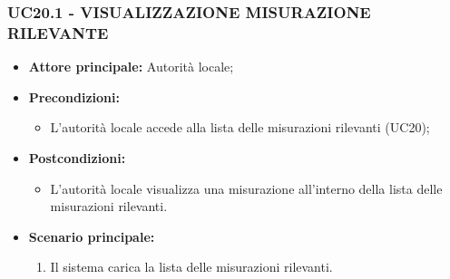 \subsubsection{UC20.1 - VISUALIZZAZIONE MISURAZIONE RILEVANTE}
\begin{itemize}
        \item \textbf{Attore principale:} Autorità locale;
        \item \textbf{Precondizioni:}
                \begin{itemize}
                        \item L'autorità locale accede alla lista delle misurazioni rilevanti (UC20);
                \end{itemize}
        \item \textbf{Postcondizioni:}
                \begin{itemize}
                        \item L'autorità locale visualizza una misurazione all'interno della lista delle misurazioni rilevanti.
                \end{itemize}
        \item \textbf{Scenario principale:}
                \begin{enumerate}
                        \item Il sistema carica la lista delle misurazioni rilevanti.
                \end{enumerate}
\end{itemize}